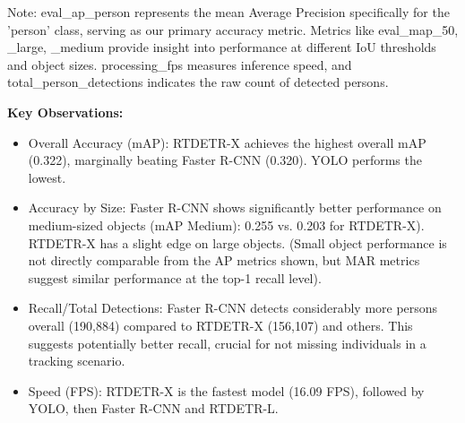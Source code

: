 \begin{table}[!htb]
  \centering
  \caption{Performance Comparison of Person Detection Models}
  \label{tab:model_performance_comparison}
  \par\medskip\footnotesize
  Note: {eval\_ap\_person} represents the mean Average Precision specifically for the 'person' class, serving as our primary accuracy metric. Metrics like {eval\_map\_50}, {\_large}, {\_medium} provide insight into performance at different IoU thresholds and object sizes. {processing\_fps} measures inference speed, and {total\_person\_detections} indicates the raw count of detected persons.
\end{table}

\textbf{Key Observations:}
\begin{itemize}
    \item Overall Accuracy (mAP): RTDETR-X achieves the highest overall mAP (0.322), marginally beating Faster R-CNN (0.320). YOLO performs the lowest.
    \item Accuracy by Size: Faster R-CNN shows significantly better performance on medium-sized objects (mAP Medium): 0.255 vs. 0.203 for RTDETR-X). RTDETR-X has a slight edge on large objects. (Small object performance is not directly comparable from the AP metrics shown, but MAR metrics suggest similar performance at the top-1 recall level).
    \item Recall/Total Detections: Faster R-CNN detects considerably more persons overall (190,884) compared to RTDETR-X (156,107) and others. This suggests potentially better recall, crucial for not missing individuals in a tracking scenario.
    \item Speed (FPS): RTDETR-X is the fastest model (16.09 FPS), followed by YOLO, then Faster R-CNN and RTDETR-L.
\end{itemize}


